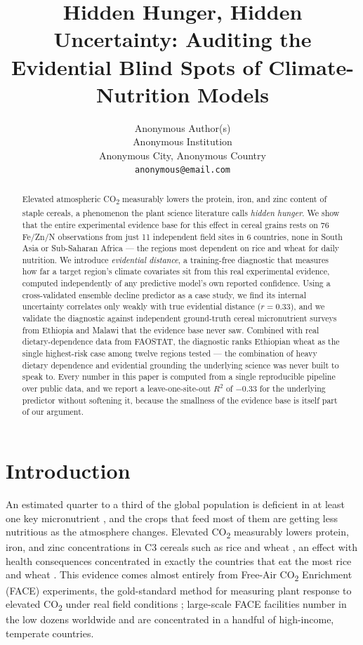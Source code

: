 \documentclass{article}
\title{Hidden Hunger, Hidden Uncertainty: Auditing the Evidential Blind Spots of Climate-Nutrition Models}
\author{%
  Anonymous Author(s) \\
  Anonymous Institution \\
  Anonymous City, Anonymous Country \\
  \texttt{anonymous@email.com}
}
\begin{document}
\maketitle

\begin{abstract}
Elevated atmospheric CO\textsubscript{2} measurably lowers the protein, iron, and zinc content of staple cereals, a phenomenon the plant science literature calls \emph{hidden hunger}. We show that the entire experimental evidence base for this effect in cereal grains rests on 76 Fe/Zn/N observations from just 11 independent field sites in 6 countries, none in South Asia or Sub-Saharan Africa --- the regions most dependent on rice and wheat for daily nutrition. We introduce \emph{evidential distance}, a training-free diagnostic that measures how far a target region's climate covariates sit from this real experimental evidence, computed independently of any predictive model's own reported confidence. Using a cross-validated ensemble decline predictor as a case study, we find its internal uncertainty correlates only weakly with true evidential distance ($r = 0.33$), and we validate the diagnostic against independent ground-truth cereal micronutrient surveys from Ethiopia and Malawi that the evidence base never saw. Combined with real dietary-dependence data from FAOSTAT, the diagnostic ranks Ethiopian wheat as the single highest-risk case among twelve regions tested --- the combination of heavy dietary dependence and evidential grounding the underlying science was never built to speak to. Every number in this paper is computed from a single reproducible pipeline over public data, and we report a leave-one-site-out $R^2$ of $-0.33$ for the underlying predictor without softening it, because the smallness of the evidence base is itself part of our argument.

\end{abstract}

\section{Introduction}

An estimated quarter to a third of the global population is deficient in at least one key micronutrient \citep{fao2023sofi}, and the crops that feed most of them are getting less nutritious as the atmosphere changes. Elevated CO\textsubscript{2} measurably lowers protein, iron, and zinc concentrations in C3 cereals such as rice and wheat \citep{loladze2014hidden, myers2014increasing}, an effect with health consequences concentrated in exactly the countries that eat the most rice and wheat \citep{zhu2018carbon, beach2019combining}. This evidence comes almost entirely from Free-Air CO\textsubscript{2} Enrichment (FACE) experiments, the gold-standard method for measuring plant response to elevated CO\textsubscript{2} under real field conditions \citep{ainsworth2005face}; large-scale FACE facilities number in the low dozens worldwide and are concentrated in a handful of high-income, temperate countries.
\end{document}
